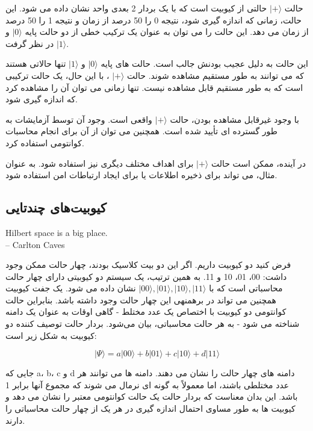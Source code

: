 \documentclass{book}
\begin{document}
حالت $\vert+\rangle$ حالتی از کیوبیت است که با یک بردار 2 بعدی واحد نشان داده می شود. این حالت، زمانی که اندازه گیری شود، نتیجه 0 را 50 درصد از زمان و نتیجه 1 را 50 درصد از زمان می دهد. این حالت را می توان به عنوان یک ترکیب خطی از دو حالت پایه $\vert0\rangle$ و $\vert 1 \rangle$ در نظر گرفت.

این حالت به دلیل عجیب بودنش جالب است. حالت های پایه $\vert 0 \rangle$ و $\vert 1 \rangle$ تنها حالاتی هستند که می توانند به طور مستقیم مشاهده شوند. حالت $\vert + \rangle$ ، با این حال، یک حالت ترکیبی است که به طور مستقیم قابل مشاهده نیست. تنها زمانی می توان آن را مشاهده کرد که اندازه گیری شود.

با وجود غیرقابل مشاهده بودن، حالت $\vert + \rangle$ واقعی است. وجود آن توسط آزمایشات به طور گسترده ای تأیید شده است. همچنین می توان از آن برای انجام محاسبات کوانتومی استفاده کرد.

در آینده، ممکن است حالت $\vert + \rangle$ برای اهداف مختلف دیگری نیز استفاده شود. به عنوان مثال، می تواند برای ذخیره اطلاعات یا برای ایجاد ارتباطات امن استفاده شود.

\subsection{کیوبیت‌های چندتایی}

\begin{latin}
	Hilbert space is a big place.\\
	\hspace{2cm}– Carlton Caves
\end{latin}




فرض کنید دو کیوبیت داریم. اگر این دو بیت کلاسیک بودند، چهار حالت ممکن وجود داشت: 00، 01، 10 و 11. به همین ترتیب، یک سیستم دو کیوبیتی دارای چهار حالت محاسباتی است که با $\vert 00 \rangle, \vert 01 \rangle, \vert 10 \rangle, \vert 11 \rangle$ نشان داده می شود. یک جفت کیوبیت همچنین می تواند در برهمنهی این چهار حالت وجود داشته باشد.
بنابراین حالت کوانتومی دو کیوبیت با اختصاص یک عدد مختلط - گاهی اوقات به عنوان یک دامنه شناخته می شود - به هر حالت محاسباتی، بیان می‌شود. بردار حالت توصیف کننده دو کیوبیت به شکل زیر است:
\begin{center}
	\begin{equation}\label{two qubit system}
		\vert \Psi \rangle = a \vert00\rangle + b \vert01\rangle + c \vert10\rangle + d \vert11\rangle 
	\end{equation}
\end{center}

جایی که a، b، c و d دامنه های چهار حالت را نشان می دهند. دامنه ها می توانند هر عدد مختلطی باشند، اما معمولاً به گونه ای نرمال می شوند که مجموع آنها برابر 1 باشد. این بدان معناست که بردار حالت یک حالت کوانتومی معتبر را نشان می دهد و کیوبیت ها به طور مساوی احتمال اندازه گیری در هر یک از چهار حالت محاسباتی را دارند.
\end{document}
